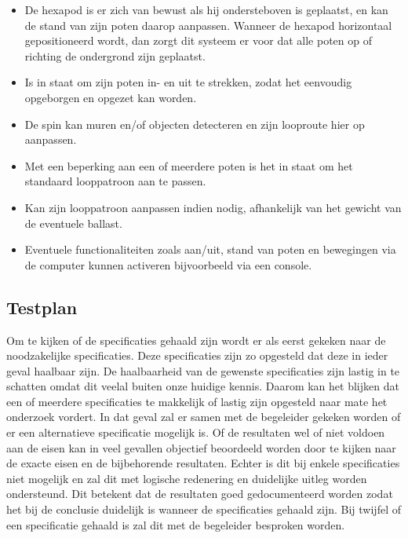 \documentclass[10pt,a4paper]{article}
\begin{document}
\begin{itemize}
\setlength\itemsep{0em}
\item De hexapod is er zich van bewust als hij ondersteboven is geplaatst, en kan de stand van zijn poten daarop aanpassen. Wanneer de hexapod horizontaal gepositioneerd wordt, dan zorgt dit systeem er voor dat alle poten op of richting de ondergrond zijn geplaatst.
\item Is in staat om zijn poten in- en uit te strekken, zodat het eenvoudig opgeborgen en opgezet kan worden.
\item De spin kan muren en/of objecten detecteren en zijn looproute hier op aanpassen. 
\item Met een beperking aan een of meerdere poten is het in staat om het standaard looppatroon aan te passen.
\item Kan zijn looppatroon aanpassen indien nodig, afhankelijk van het gewicht van de eventuele ballast.
\item Eventuele functionaliteiten zoals aan/uit, stand van poten en bewegingen via de computer kunnen activeren bijvoorbeeld via een console.
\end{itemize}

\subsection{Testplan}
Om te kijken of de specificaties gehaald zijn wordt er als eerst gekeken naar de noodzakelijke specificaties. Deze specificaties zijn zo opgesteld dat deze in ieder geval haalbaar zijn. De haalbaarheid van de gewenste specificaties zijn lastig in te schatten omdat dit veelal buiten onze huidige kennis. Daarom kan het blijken dat een of meerdere specificaties te makkelijk of lastig zijn opgesteld naar mate het onderzoek vordert. In dat geval zal er samen met de begeleider gekeken worden of er een alternatieve specificatie mogelijk is.
Of de resultaten wel of niet voldoen aan de eisen kan in veel gevallen objectief beoordeeld worden door te kijken naar de exacte eisen en de bijbehorende resultaten. Echter is dit bij enkele specificaties niet mogelijk en zal dit met logische redenering en duidelijke uitleg worden ondersteund.
Dit betekent dat de resultaten goed gedocumenteerd worden zodat het bij de conclusie duidelijk is wanneer de specificaties gehaald zijn. Bij twijfel of een specificatie gehaald is zal dit met de begeleider besproken worden.
\end{document}
